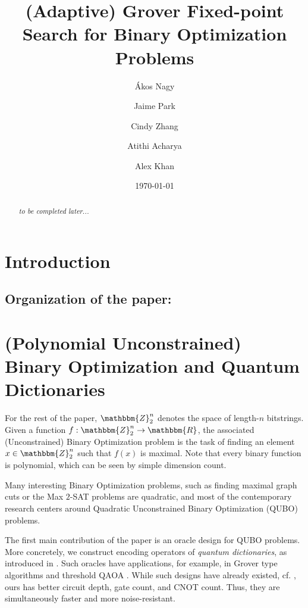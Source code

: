 \documentclass[reqno,oneside,12pt]{amsart}  %
\title{(Adaptive) Grover Fixed-point Search for Binary Optimization Problems}
\date{\today}
\author{\'Akos Nagy}
\author{Jaime Park}
\author{Cindy Zhang}
\author{Atithi Acharya}
\author{Alex Khan}
\numberwithin{equation}{section}                %
\newtheorem*{acknowledgment}{Acknowledgments}
\def\rl{\mathbbm{R}}
\def\Z{\mathbbm{Z}}
\begin{document}
\begin{abstract}
	\textit{to be completed later...}
\end{abstract}

\maketitle

\section{Introduction}


\smallskip

\subsection*{Organization of the paper:} 

\begin{comment}
\smallskip

\begin{acknowledgment}
   
\end{acknowledgment}
\end{comment}

\bigskip

\section{(Polynomial Unconstrained) Binary Optimization and Quantum Dictionaries}
\label{sec:qubos_and_qdicts}

For the rest of the paper, $\Z_2^n$ denotes the space of length-$n$ bitstrings. Given a function $f : \Z_2^n \rightarrow \rl$, the associated (Unconstrained) Binary Optimization problem is the task of finding an element $x \in \Z_2^n$ such that $f (x)$ is maximal. Note that every binary function is polynomial, which can be seen by simple dimension count.

Many interesting Binary Optimization problems, such as finding maximal graph cuts or the Max $2$-SAT problems are quadratic, and most of the contemporary research centers around Quadratic Unconstrained  Binary Optimization (QUBO) problems.

\medskip

The first main contribution of the paper is an oracle design for QUBO problems. More concretely, we construct encoding operators of \emph{quantum dictionaries}, as introduced in \cite{gilliam_foundational_2021}. Such oracles have applications, for example, in Grover type algorithms and threshold QAOA \cite{golden_threshold_2021}. While such designs have already existed, cf. \cite{gilliam_grover_2021}, ours has better circuit depth, gate count, and CNOT count. Thus, they are simultaneously faster and more noise-resistant.
\end{document}
